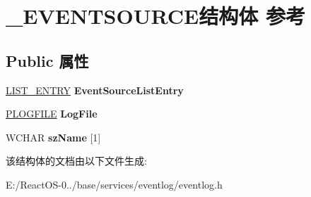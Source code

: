 \hypertarget{struct___e_v_e_n_t_s_o_u_r_c_e}{}\section{\+\_\+\+E\+V\+E\+N\+T\+S\+O\+U\+R\+C\+E结构体 参考}
\label{struct___e_v_e_n_t_s_o_u_r_c_e}
\subsection*{Public 属性}
\begin{DoxyCompactItemize}
\item 
\mbox{\label{struct___e_v_e_n_t_s_o_u_r_c_e_a41a7ffaa8a33d27592fedb367f7a9954}} 
\hyperlink{struct___l_i_s_t___e_n_t_r_y}{L\+I\+S\+T\+\_\+\+E\+N\+T\+RY} {\bfseries Event\+Source\+List\+Entry}
\item 
\mbox{\label{struct___e_v_e_n_t_s_o_u_r_c_e_aa2d0c09b0c9747b8b005d57ca9849823}} 
\hyperlink{struct___l_o_g_f_i_l_e}{P\+L\+O\+G\+F\+I\+LE} {\bfseries Log\+File}
\item 
\mbox{\label{struct___e_v_e_n_t_s_o_u_r_c_e_a344ca63a7b9a32952b3064477d925a12}} 
W\+C\+H\+AR {\bfseries sz\+Name} \mbox{[}1\mbox{]}
\end{DoxyCompactItemize}


该结构体的文档由以下文件生成\+:\begin{DoxyCompactItemize}
\item 
E\+:/\+React\+O\+S-\/0../base/services/eventlog/eventlog.\+h\end{DoxyCompactItemize}
